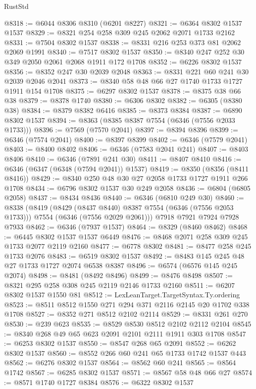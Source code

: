 \begin{lexlean}{RustStd}
\begin{coremodule}
@8318 := @6044 @8306 @8310 (@6201 @8227)
@8321 := @6364 @8302 @1537 @1537
@8329 := @8321 @254 @258 @309 @245 @2062 @2071 @1733 @2162
@8331 := @7504 @8302 @1537
@8338 := @8331 @216 @253 @373 @81 @2062 @2069 @1991
@8340 := @7517 @8302 @1537
@8350 := @8340 @247 @252 @30 @349 @2050 @2061 @2068 @1911 @172 @1708
@8352 := @6226 @8302 @1537
@8356 := @8352 @247 @30 @2039 @2048
@8363 := @8331 @221 @60 @241 @30 @2039 @2046 @2041
@8373 := @8340 @58 @48 @66 @27 @1740 @1733 @1727 @1911 @154 @1708
@8375 := @6297 @8302 @1537
@8378 := @8375 @38 @66 @38
@8379 := @8378 @1740
@8380 := @6306 @8302
@8382 := @6305 (@8380 @38)
@8384 := @8379 @8382 @6416
@8385 := @8373 @8384
@8387 := @6890 @8302 @1537
@8394 := @8363 (@8385 @8387 @7554 (@6346 (@7556 @2033 @1733)))
@8396 := @7569 (@7570 @2041)
@8397 := @8394 @8396
@8399 := @6346 (@7574 @2041)
@8400 := @8397 @8399
@8402 := @6346 (@7579 @2041)
@8403 := @8400 @8402
@8406 := @6346 (@7583 @2041 @241)
@8407 := @8403 @8406
@8410 := @6346 (@7891 @241 @30)
@8411 := @8407 @8410
@8416 := @6346 (@6347 (@6348 (@7594 @2041)) @1537)
@8419 := @8350 (@8356 (@8411 @8416))
@8429 := @8340 @250 @48 @30 @27 @2058 @1733 @1727 @1911 @266 @1708
@8434 := @6796 @8302 @1537 @30 @249 @2058
@8436 := @6804 (@6805 @2058)
@8437 := @8434 @8436
@8440 := @6346 (@6810 @249 @30)
@8460 := @8338
    (@8419
      (@8429 (@8437 @8440) @8387 @7554 (@6346 (@7556 @2053 @1733)))
      @7554
      (@6346 (@7556 @2029 @2061)))
    @7918
    @7921
    @7924
    @7928
    @7933
@8462 := @6346 (@7937 @1537)
@8464 := @8329 (@8460 @8462)
@8468 := @6445 @8302 @1537 @1537 @6449
@8476 := @8468 @2071 @258 @309 @245 @1733 @2077 @2119 @2160
@8477 := @6778 @8302
@8481 := @8477 @258 @245 @1733 @2076
@8483 := @6519 @8302 @1537
@8492 := @8483 @145 @245 @48 @27 @1733 @1727 @2074 @6538 @8387
@8496 := @6574 (@6576 @145 @245 @2074)
@8498 := @8481 (@8492 @8496)
@8499 := @8476 @8498
@8507 := @8321 @295 @258 @308 @245 @2119 @2146 @1733 @2160
@8511 := @6207 @8302 @1537 @1550 @81
@8512 := LexLeanTarget.TargetSyntax.Ty.ordering
@8523 := @8511 @8512 @1550 @271 @294 @371 @2116 @2145 @20 @1702 @338 @1708
@8527 := @8352 @271 @8512 @2102 @2114
@8529 := @8331 @261 @270
@8530 := @239 @623
@8535 := @8529 @8530 @8512 @2102 @2112 @2104
@8545 := @8340 @268 @49 @65 @623 @2091 @2101 @2111 @1911 @303 @1708
@8547 := @6253 @8302 @1537
@8550 := @8547 @268 @65 @2091
@8552 := @6262 @8302 @1537
@8560 := @8552 @266 @60 @241 @65 @1733 @1742 @1537 @443
@8562 := @6276 @8302 @1537
@8564 := @8562 @60 @241
@8565 := @8564 @1742
@8567 := @6285 @8302 @1537
@8571 := @8567 @58 @48 @66 @27
@8574 := @8571 @1740 @1727 @8384
@8576 := @6322 @8302 @1537

\end{coremodule}
\end{lexlean}

